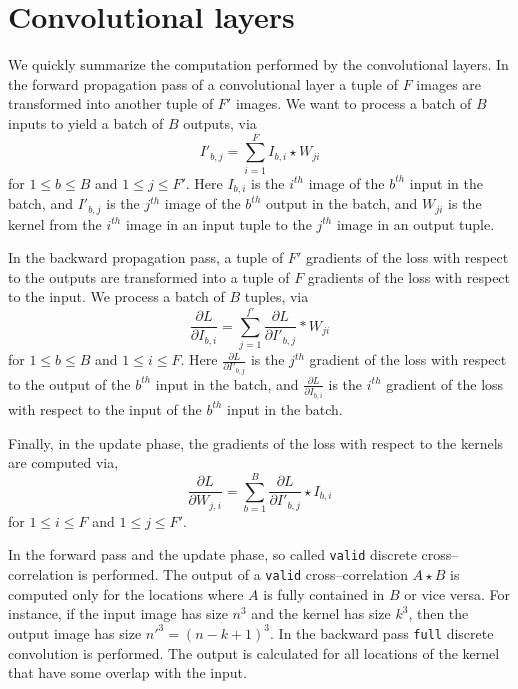 \section{Convolutional layers}
\label{sec-conv-layers}

  We quickly summarize the computation performed by the convolutional
  layers.  In the forward propagation pass of a convolutional layer a
  tuple of $F$ images are transformed into another tuple of $F'$
  images.  We want to process a batch of $B$ inputs to yield a batch
  of $B$ outputs, via
  \[
  I'_{b,j} = \sum_{i=1}^F I_{b,i} \star W_{ji}
  \]
  for $1 \le b \le B$ and $1 \le j \le F'$.  Here $I_{b,i}$ is the
  $i^{th}$ image of the $b^{th}$ input in the batch, and $I'_{b,j}$ is
  the $j^{th}$ image of the $b^{th}$ output in the batch, and $W_{ji}$
  is the kernel from the $i^{th}$ image in an input tuple to the
  $j^{th}$ image in an output tuple.

  In the backward propagation pass, a tuple of $F'$ gradients of the
  loss with respect to the outputs are transformed into a tuple of $F$
  gradients of the loss with respect to the input.  We process a batch
  of $B$ tuples, via
  \[
  \frac{\partial L}{\partial I_{b,i}} = \sum_{j=1}^{f'}
  \frac{\partial L}{\partial I'_{b,j}} \ast W_{ji}
  \]
  for $1 \le b \le B$ and $1 \le i \le F$.  Here $\frac{\partial
    L}{\partial I'_{b,j}}$ is the $j^{th}$ gradient of the loss with
  respect to the output of the $b^{th}$ input in the batch, and
  $\frac{\partial L}{\partial I_{b,i}}$ is the $i^{th}$ gradient of
  the loss with respect to the input of the $b^{th}$ input in the
  batch.

  Finally, in the update phase, the gradients of the loss with respect
  to the kernels are computed via,
  \[
  \frac{\partial L}{\partial W_{j,i}} = \sum_{b=1}^B
  \frac{\partial L}{\partial I'_{b,j}}  \star I_{b,i}
  \]
  for $1 \le i \le F$ and $1 \le j \le F'$.

  In the forward pass and the update phase, so called \texttt{valid}
  discrete cross--correlation is performed.  The output of a
  \texttt{valid} cross--correlation $A \star B$ is computed only for
  the locations where $A$ is fully contained in $B$ or vice versa.
  For instance, if the input image has size $n^3$ and the kernel has
  size $k^3$, then the output image has size $n'^3 = (n-k+1)^3$.  In
  the backward pass \texttt{full} discrete convolution is performed.
  The output is calculated for all locations of the kernel that have
  some overlap with the input.


